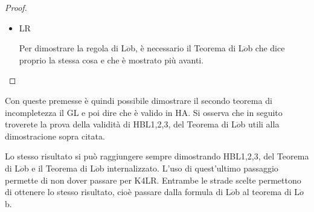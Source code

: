 \begin{proof}
\begin{enumerate}
\begin{itemize}
\begin{itemize}
$K4LR\vdash\Box\alpha\rightarrow\Box\Box\alpha$

qualunque sia $\#$ in HA diventa:

$HA \vdash \Tnumg{\#\alpha}\rightarrow\Tnumg{\Tnumg{\#\alpha}}$

che \`e proprio HBL3 applicato alla sentenza $\#\alpha$.\\

\item LR 

Per dimostrare la regola di L$\ddot{o}$b, \`e necessario il Teorema di L$\ddot{o}$b che dice proprio la stessa cosa e che 
\`e mostrato pi\`u avanti.
\end{itemize}
\end{itemize}
\end{enumerate}
\end{proof}

\begin{oss}
Con queste premesse \`e quindi possibile dimostrare il secondo teorema di incompletezza 
il GL e poi dire che \`e valido in HA.
Si osserva che in seguito troverete la prova della  validità di HBL1,2,3, del Teorema di L$\ddot{o}$b utili alla dimostracione sopra citata.

Lo stesso risultato si può raggiungere sempre dimostrando HBL1,2,3, del Teorema di L$\ddot{o}$b e il 
Teorema di L$\ddot{o}$b internalizzato. L'uso di quest'ultimo passaggio permette di non dover 
passare per K4LR. Entrambe le strade scelte permettono di ottenere lo stesso
risultato, cio\`e passare dalla formula di L$\ddot{o}$b al teorema di L$\ddot{o}$b.
\end{oss}



